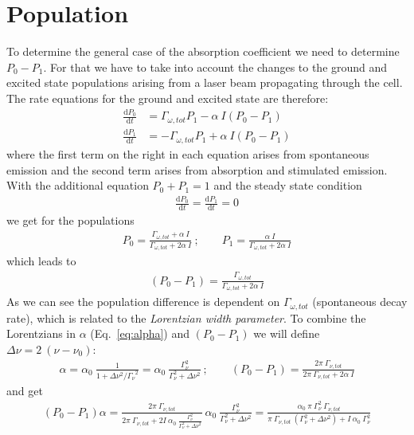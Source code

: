 \section{Population}   %

To determine the general case of the absorption coefficient we need to determine 
\(P_0-P_1 \). For that we have to take into account the changes to the ground and 
excited state populations arising from a laser beam propagating through the cell. 
The rate equations for the ground and excited state are therefore:
\begin{align}
    \frac{\mathrm{d}P_0}{\mathrm{d}t} &= \Gamma_{\omega,tot} P_1 - \alpha~I (P_0-P_1) \nonumber \\
    \frac{\mathrm{d}P_1}{\mathrm{d}t} &= -\Gamma_{\omega,tot} P_1 + \alpha~I (P_0-P_1)
\end{align} 
where the first term on the right in each equation arises from spontaneous emission 
and the second term arises from absorption and stimulated emission.\\
With the additional equation \(P_0+P_1=1 \) and the steady state condition
\begin{align}
    \frac{\mathrm{d}P_0}{\mathrm{d}t} = \frac{\mathrm{d}P_1}{\mathrm{d}t} = 0
\end{align}
we get for the populations
\begin{align}
        P_0 = \frac{\Gamma_{\omega,tot} + \alpha~I}{\Gamma_{\omega,tot} + 2 \alpha~I}~; 
        \qquad 
        P_1 = \frac{\alpha~I}{\Gamma_{\omega,tot} + 2 \alpha~I}
\end{align}
which leads to
\begin{align}
    (P_0-P_1) = \frac{\Gamma_{\omega,tot}}{\Gamma_{\omega,tot} + 2 \alpha~I} 
\end{align}
As we can see the population difference is dependent on \(\Gamma_{\omega,tot} \) 
(spontaneous decay rate), which is related to the \textit{Lorentzian width parameter}. 
To combine the Lorentzians in \(\alpha \) (Eq.~\ref{eq:alpha}) and \( (P_0-P_1) \) 
we will define \(\Delta\nu = 2~(\nu-\nu_0) \):
\begin{align}
    \alpha = \alpha_0~\frac{1}{ 1+ \Delta\nu^2 / {\Gamma_\nu}^2 } 
    = \alpha_0~\frac{\Gamma_\nu^2}{\Gamma_\nu^2 + \Delta\nu^2}~; \qquad
    (P_0-P_1) = \frac{2\pi~\Gamma_{\nu,tot}}{2\pi~\Gamma_{\nu,tot} + 2 \alpha~I}
\end{align}
and get
\begin{align}
    (P_0-P_1)\alpha = \frac{2\pi~\Gamma_{\nu,tot}}
    {2\pi~\Gamma_{\nu,tot} + 2I~\alpha_0~\frac{\Gamma_\nu^2}{\Gamma_\nu^2 + \Delta\nu^2}}~ 
    \alpha_0~\frac{\Gamma_\nu^2}{\Gamma_\nu^2 + \Delta\nu^2} = 
    \frac{\alpha_0~\pi~\Gamma_\nu^2~\Gamma_{\nu,tot}}
    {\pi~\Gamma_{\nu,tot}~(\Gamma_\nu^2 + \Delta\nu^2)+I~\alpha_0~\Gamma_\nu^2}
\end{align}
